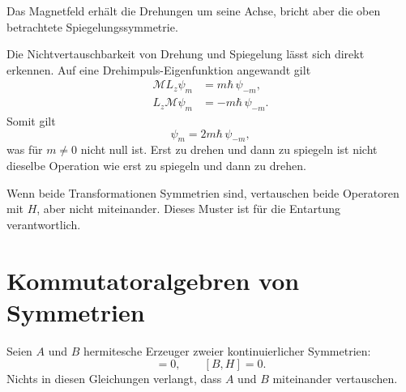 Das Magnetfeld erhält die Drehungen um seine Achse, bricht aber die oben betrachtete Spiegelungssymmetrie.

\begin{classroomqa}
\end{classroomqa}

Die Nichtvertauschbarkeit von Drehung und Spiegelung lässt sich direkt erkennen. Auf eine Drehimpuls-Eigenfunktion angewandt gilt
\begin{align}
\mathcal M L_z\psi_m
&=m\hbar\,\psi_{-m},\\
L_z\mathcal M\psi_m
&=-m\hbar\,\psi_{-m}.
\end{align}
Somit gilt
\begin{equation}
[\mathcal M,L_z]\psi_m
=2m\hbar\,\psi_{-m},
\end{equation}
was für \(m\neq0\) nicht null ist. Erst zu drehen und dann zu spiegeln ist nicht dieselbe Operation wie erst zu spiegeln und dann zu drehen.

Wenn beide Transformationen Symmetrien sind, vertauschen beide Operatoren mit \(H\), aber nicht miteinander. Dieses Muster ist für die Entartung verantwortlich.

\begin{classroomqa}
\end{classroomqa}

\section{Kommutatoralgebren von Symmetrien}

Seien \(A\) und \(B\) hermitesche Erzeuger zweier kontinuierlicher Symmetrien:
\begin{equation}
[A,H]=0,
\qquad
[B,H]=0.
\end{equation}
Nichts in diesen Gleichungen verlangt, dass \(A\) und \(B\) miteinander vertauschen.

